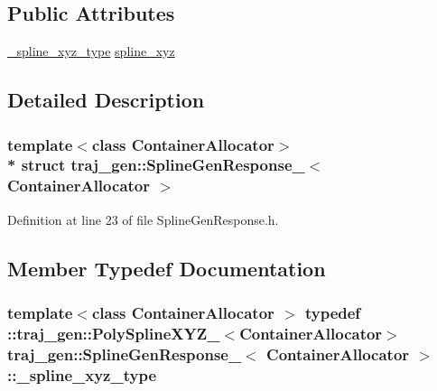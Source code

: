 \subsection*{Public Attributes}
\begin{DoxyCompactItemize}
\item 
\hyperlink{structtraj__gen_1_1_spline_gen_response___a2b22348645511f99126b3078bf1ae10d}{\+\_\+spline\+\_\+xyz\+\_\+type} \hyperlink{structtraj__gen_1_1_spline_gen_response___a65441baa1583015577395779f71981c9}{spline\+\_\+xyz}
\end{DoxyCompactItemize}


\subsection{Detailed Description}
\subsubsection*{template$<$class Container\+Allocator$>$\\*
struct traj\+\_\+gen\+::\+Spline\+Gen\+Response\+\_\+$<$ Container\+Allocator $>$}



Definition at line 23 of file Spline\+Gen\+Response.\+h.



\subsection{Member Typedef Documentation}
\subsubsection[{\texorpdfstring{\+\_\+spline\+\_\+xyz\+\_\+type}{_spline_xyz_type}}]{\setlength{\rightskip}{0pt plus 5cm}template$<$class Container\+Allocator $>$ typedef \+::{\bf traj\+\_\+gen\+::\+Poly\+Spline\+X\+Y\+Z\+\_\+}$<$Container\+Allocator$>$ {\bf traj\+\_\+gen\+::\+Spline\+Gen\+Response\+\_\+}$<$ Container\+Allocator $>$\+::{\bf \+\_\+spline\+\_\+xyz\+\_\+type}}\hypertarget{structtraj__gen_1_1_spline_gen_response___a2b22348645511f99126b3078bf1ae10d}{}\label{structtraj__gen_1_1_spline_gen_response___a2b22348645511f99126b3078bf1ae10d}


